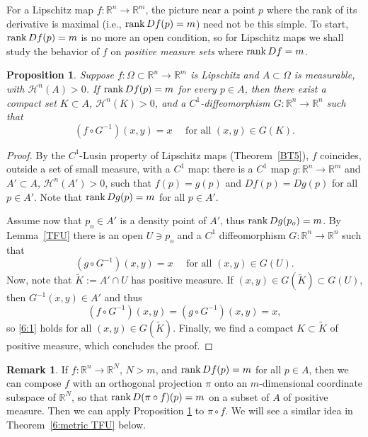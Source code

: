 \documentclass[12pt,leqno]{amsart}
\newtheorem{proposition}[theorem]{Proposition}
\theoremstyle{definition}
\newtheorem{remark}[theorem]{Remark}
\newcommand{\bbbr}{\mathbb R}
\def\H{{\mathcal H}}
\def\rank{{\rm rank\,}}
\numberwithin{theorem}{section} \numberwithin{equation}{section}
\begin{document}
For a Lipschitz map $f:\bbbr^n\to\bbbr^m$, the picture near a point $p$ where the rank of its derivative is maximal (i.e., $\rank Df(p)=m$) need not be this simple. To start, $\rank Df(p)=m$ is no more an open condition, so for Lipschitz maps we shall study the behavior of $f$ on \emph{positive measure sets} where $\rank Df=m$.

\begin{proposition}
\label{6:prop1}
Suppose $f:\Omega\subset \bbbr^n\to\bbbr^m$ is Lipschitz and $A\subset\Omega$ is measurable, with $\H^n(A)>0$. If $\rank Df(p)=m$ for every $p\in A$, then there exist a compact set $K\subset A$, $\H^n(K)>0$, and a $C^1$-diffeomorphism $G:\bbbr^n\to\bbbr^n$ such that
\begin{equation}
\label{6:1}
(f\circ G^{-1})(x,y)=x \quad \text{ for all }(x,y)\in G(K).
\end{equation}
\end{proposition}

\begin{proof}
By the $C^1$-Lusin property of Lipschitz maps (Theorem~\ref{BT5}), $f$ coincides, outside a set of small measure, with a $C^1$ map: there is a $C^1$ map $g:\bbbr^n\to\bbbr^m$ and $A'\subset A$, $\H^n(A')>0$, such that $f(p)=g(p)$ and $Df(p)=Dg(p)$ for all $p\in A'$. Note that $\rank Dg(p)=m$ for all $p\in A'$.

Assume now that $p_o\in A'$ is a density point of $A'$, thus $\rank Dg(p_o)=m$. By Lemma~\ref{TFU} there is an open $U\ni p_o$ and a $C^1$ diffeomorphism $G:\bbbr^n\to\bbbr^n$ such that
$$
(g\circ G^{-1})(x,y)=x \quad \text{ for all }(x,y)\in G(U).
$$
Now, note that $\tilde K:=A'\cap U$ has positive measure. If $(x,y)\in G(\tilde K)\subset G(U)$, then $G^{-1}(x,y)\in A'$ and thus
$$
(f\circ G^{-1})(x,y)=(g\circ G^{-1})(x,y)=x,
$$
so \eqref{6:1} holds for all $(x,y)\in G(\tilde K)$. Finally, we find a compact $K\subset \tilde K$ of positive measure, which concludes the proof.
\end{proof}
\begin{remark}
If $f:\bbbr^n\to\bbbr^N$, $N>m$, and $\rank Df(p)=m$ for all $p\in A$, then we can compose $f$ with an orthogonal projection $\pi$ onto an $m$-dimensional coordinate subspace of $\bbbr^N$, so that $\rank D(\pi\circ f)(p)=m$ on a subset of $A$ of positive measure. Then we can apply Proposition \ref{6:prop1} to $\pi\circ f$. We will see a similar idea in Theorem~\ref{6:metric TFU} below.
\end{remark}
\end{document}

